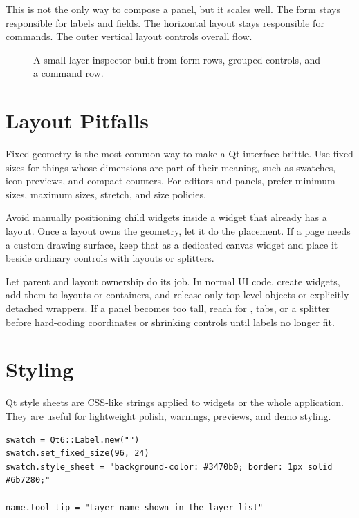 This is not the only way to compose a panel, but it scales well. The form stays responsible for labels and fields. The horizontal layout stays responsible for commands. The outer vertical layout controls overall flow.

\begin{figure}[H]
  \centering
  {\setlength{\fboxsep}{10pt}%
   \colorbox{black!10}{%
   }}%
  \caption{A small layer inspector built from form rows, grouped controls, and a command row.}
\end{figure}

\section{Layout Pitfalls}

Fixed geometry is the most common way to make a Qt interface brittle. Use fixed sizes for things whose dimensions are part of their meaning, such as swatches, icon previews, and compact counters. For editors and panels, prefer minimum sizes, maximum sizes, stretch, and size policies.

Avoid manually positioning child widgets inside a widget that already has a layout. Once a layout owns the geometry, let it do the placement. If a page needs a custom drawing surface, keep that as a dedicated canvas widget and place it beside ordinary controls with layouts or splitters.

Let parent and layout ownership do its job. In normal UI code, create widgets, add them to layouts or containers, and release only top-level objects or explicitly detached wrappers. If a panel becomes too tall, reach for , tabs, or a splitter before hard-coding coordinates or shrinking controls until labels no longer fit.

\section{Styling}

Qt style sheets are CSS-like strings applied to widgets or the whole application. They are useful for lightweight polish, warnings, previews, and demo styling.

\begin{lstlisting}[style=crystal]
swatch = Qt6::Label.new("")
swatch.set_fixed_size(96, 24)
swatch.style_sheet = "background-color: #3470b0; border: 1px solid #6b7280;"

name.tool_tip = "Layer name shown in the layer list"
\end{lstlisting}

